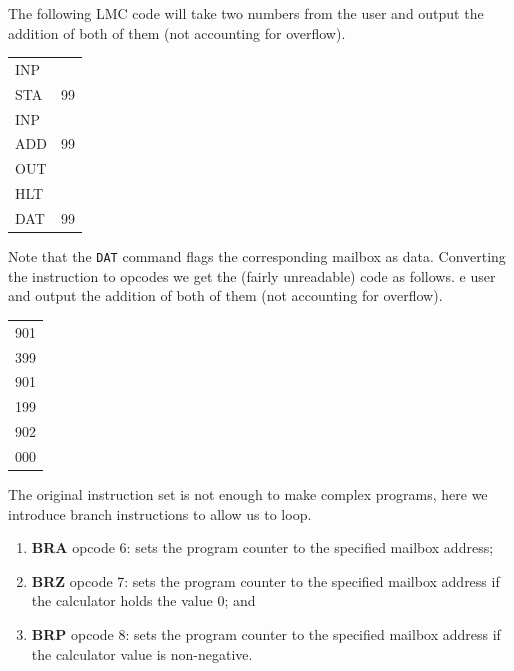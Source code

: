 \begin{example}
    The following LMC code will take two numbers from the user and output the addition of both of them (not accounting for overflow).
    \begin{center}
        \normalfont
        \ttfamily
        \begin{tabular}{p{2em} p{2em}}
            INP \\
            STA & 99 \\
            INP & \\
            ADD & 99 \\
            OUT \\
            HLT \\
            DAT & 99 \\
        \end{tabular}
    \end{center}
    Note that the \texttt{DAT} command flags the corresponding mailbox as data. Converting the instruction to opcodes we get the (fairly unreadable) code as follows.
    e user and output the addition of both of them (not accounting for overflow).
    \begin{center}
        \normalfont
        \ttfamily
        \begin{tabular}{p{2em}}
            901 \\
            399 \\
            901 \\
            199 \\
            902 \\
            000 \\
        \end{tabular}
    \end{center}
\end{example}

\begin{definition}
    The original instruction set is not enough to make complex programs, here we introduce branch instructions to allow us to loop.
    \begin{enumerate}
        \item \textbf{BRA} opcode 6: sets the program counter to the specified mailbox address;
        \item \textbf{BRZ} opcode 7: sets the program counter to the specified mailbox address if the calculator holds the value 0; and
        \item \textbf{BRP} opcode 8: sets the program counter to the specified mailbox address if the calculator value is non-negative.
    \end{enumerate}
\end{definition}

